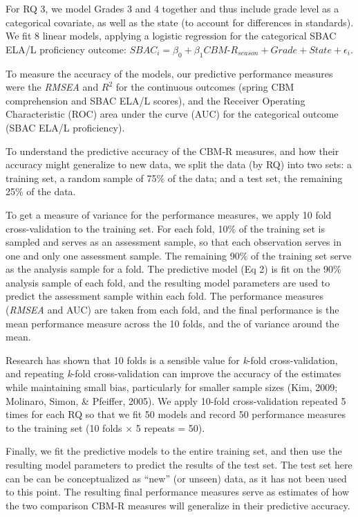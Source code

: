 \documentclass[
  english,
  man, fleqn, noextraspace]{apa6}
\begin{document}
For RQ 3, we model Grades 3 and 4 together and thus include grade level as a categorical covariate, as well as the state (to account for differences in standards). We fit 8 linear models, applying a logistic regression for the categorical SBAC ELA/L proficiency outcome: \(SBAC_i = \beta_0 + \beta_1CBM\mbox{-}R_{season} + Grade + State + \epsilon_i\).

To measure the accuracy of the models, our predictive performance measures were the \emph{RMSEA} and \(R^2\) for the continuous outcomes (spring CBM comprehension and SBAC ELA/L scores), and the Receiver Operating Characteristic (ROC) area under the curve (AUC) for the categorical outcome (SBAC ELA/L proficiency).

To understand the predictive accuracy of the CBM-R measures, and how their accuracy might generalize to new data, we split the data (by RQ) into two sets: a training set, a random sample of 75\% of the data; and a test set, the remaining 25\% of the data.

To get a measure of variance for the performance measures, we apply 10 fold cross-validation to the training set. For each fold, 10\% of the training set is sampled and serves as an assessment sample, so that each observation serves in one and only one assessment sample. The remaining 90\% of the training set serve as the analysis sample for a fold. The predictive model (Eq 2) is fit on the 90\% analysis sample of each fold, and the resulting model parameters are used to predict the assessment sample within each fold. The performance measures (\emph{RMSEA} and AUC) are taken from each fold, and the final performance is the mean performance measure across the 10 folds, and the of variance around the mean.

Research has shown that 10 folds is a sensible value for \emph{k}-fold cross-validation, and repeating \emph{k}-fold cross-validation can improve the accuracy of the estimates while maintaining small bias, particularly for smaller sample sizes (Kim, 2009; Molinaro, Simon, \& Pfeiffer, 2005). We apply 10-fold cross-validation repeated 5 times for each RQ so that we fit 50 models and record 50 performance measures to the training set (10 folds \(\times\) 5 repeats = 50).

Finally, we fit the predictive models to the entire training set, and then use the resulting model parameters to predict the results of the test set. The test set here can be can be conceptualized as \enquote{new} (or unseen) data, as it has not been used to this point. The resulting final performance measures serve as estimates of how the two comparison CBM-R measures will generalize in their predictive accuracy.
\end{document}
